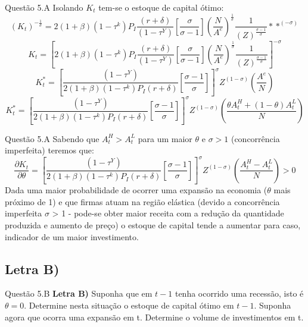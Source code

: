 \documentclass[aspectratio=169]{beamer}
\begin{document}
\begin{frame}{Questão 5.A}
Isolando $K_t$ tem-se o estoque de capital ótimo:
\begin{equation}
    (K_t)^{-\frac{1}{\sigma}} = 2(1+\beta)(1-\tau^k)P_I\frac{(r+\delta)}{(1-\tau^Y)}\left[\frac{\sigma}{\sigma-1}\right]\left(\frac{N}{A^{e}}\right)^\frac{1}{\sigma}\frac{1}{(Z)^{\frac{\sigma-1}{\sigma}}} **^{(-\sigma)}
\end{equation}
\begin{equation}
    K_t = \left[2(1+\beta)(1-\tau^k)P_I\frac{(r+\delta)}{(1-\tau^Y)}\left[\frac{\sigma}{\sigma-1}\right]\left(\frac{N}{A^{e}}\right)^\frac{1}{\sigma}\frac{1}{(Z)^{\frac{\sigma-1}{\sigma}}}\right]^{-\sigma}
\end{equation}
\begin{equation}
    K_t^* = \left[\frac{(1-\tau^Y)}{2(1+\beta)(1-\tau^k)P_I(r+\delta)}\left[\frac{\sigma-1}{\sigma}\right]\right]^{\sigma}Z^{(1-\sigma)}\left(\frac{A^{e}}{N}\right)
\end{equation}
\begin{equation}
    K_t^* = \left[\frac{(1-\tau^Y)}{2(1+\beta)(1-\tau^k)P_I(r+\delta)}\left[\frac{\sigma-1}{\sigma}\right]\right]^{\sigma}Z^{(1-\sigma)}\left(\frac{\theta A_{t}^H+(1-\theta)A_{t}^L}{N}\right)
\end{equation}
\end{frame}

\begin{frame}{Questão 5.A}
Sabendo que $A_t^H>A_t^L$ para um maior $\theta$ e $\sigma > 1$ (concorrência imperfeita) teremos que:
\begin{equation}
    \frac{\partial K_t}{\partial \theta}=\left[\frac{(1-\tau^Y)}{2(1+\beta)(1-\tau^k)P_I(r+\delta)}\left[\frac{\sigma-1}{\sigma}\right]\right]^{\sigma}Z^{(1-\sigma)}\left(\frac{A_{t}^H-A_{t}^L}{N}\right) > 0
\end{equation}
Dada uma maior probabilidade de ocorrer uma expansão na economia ($\theta$ mais próximo de 1) e que firmas atuam na região elástica (devido a concorrência imperfeita $\sigma$ > 1 - pode-se obter maior receita com a redução da quantidade produzida e aumento de preço) o estoque de capital tende a aumentar para caso, indicador de um maior investimento.
\end{frame}

\subsection{Letra B)}
\begin{frame}{Questão 5.B}
\textbf{Letra B)} Suponha que em $t-1$ tenha ocorrido uma recessão, isto é $\theta = 0$. Determine nesta
situação o estoque de capital ótimo em $t−1$. Suponha agora que ocorra uma expansão
em t. Determine o volume de investimentos em t.
\end{frame}
\end{document}
